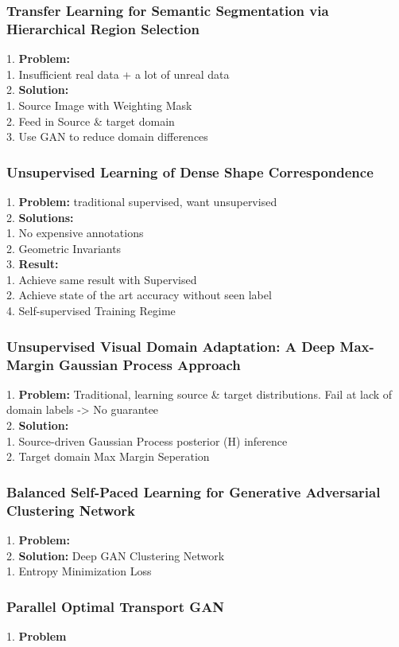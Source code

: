 \subsubsection{Transfer Learning for Semantic Segmentation via Hierarchical Region Selection}
    1. {\bf Problem:} \\
        1. Insufficient real data + a lot of unreal data \\
    2. {\bf Solution:} \\
        1. Source Image with Weighting Mask \\
        2. Feed in Source \& target domain \\
        3. Use GAN to reduce domain differences \\
\subsubsection{Unsupervised Learning of Dense Shape Correspondence}
    1. {\bf Problem:} traditional supervised, want unsupervised \\
    2. {\bf Solutions:} \\
        1. No expensive annotations \\
        2. Geometric Invariants \\
    3. {\bf Result:} \\
        1. Achieve same result with Supervised \\
        2. Achieve state of the art accuracy without seen label \\
    4. Self-supervised Training Regime \\
\subsubsection{Unsupervised Visual Domain Adaptation: A Deep Max-Margin Gaussian Process Approach}
    1. {\bf Problem:} Traditional, learning source \& target distributions. Fail at lack of domain labels -> No guarantee \\
    2. {\bf Solution:} \\
        1. Source-driven Gaussian Process posterior (H) inference \\
        2. Target domain Max Margin Seperation \\
\subsubsection{Balanced Self-Paced Learning for Generative Adversarial Clustering Network}
    1. {\bf Problem:}  \\
    2. {\bf Solution:} Deep GAN Clustering Network \\
        1. Entropy Minimization Loss \\
\subsubsection{Parallel Optimal Transport GAN}
    1. {\bf Problem}
